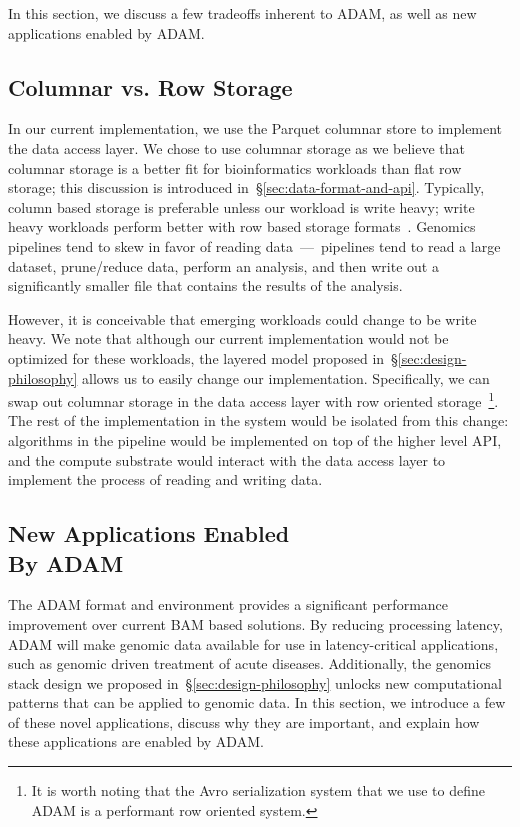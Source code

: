 \documentclass[10pt,twocolumn]{article}
\theoremstyle{plain}
\begin{document}
In this section, we discuss a few tradeoffs inherent to ADAM, as well as new applications enabled by ADAM.

\subsection{Columnar vs. Row Storage}
\label{sec:columnar-vs-row-storage}

In our current implementation, we use the Parquet columnar store to implement the data access layer. We chose to use
columnar storage as we believe that columnar storage is a better fit for bioinformatics workloads than flat row storage;
this discussion is introduced in~\S\ref{sec:data-format-and-api}. Typically, column based storage is preferable unless
our workload is write heavy; write heavy workloads perform better with row based storage formats~\cite{stonebraker05}.
Genomics pipelines tend to skew in favor of reading data~---~pipelines tend to read a large dataset, prune/reduce data,
perform an analysis, and then write out a significantly smaller file that contains the results of the analysis.

However, it is conceivable that emerging workloads could change to be write heavy. We note that although our current
implementation would not be optimized for these workloads, the layered model proposed in~\S\ref{sec:design-philosophy}
allows us to easily change our implementation. Specifically, we can swap out columnar storage in the data access layer with
row oriented storage~\footnote{It is worth noting that the Avro serialization system that we use to define ADAM is a performant
row oriented system.}. The rest of the implementation in the system would be isolated from this change: algorithms in the
pipeline would be implemented on top of the higher level API, and the compute substrate would interact with the data access
layer to implement the process of reading and writing data.

\subsection{New Applications Enabled\\By ADAM}
\label{sec:new-applications}

The ADAM format and environment provides a significant performance improvement over current BAM based solutions. By reducing
processing latency, ADAM will make genomic data available for use in latency-critical applications, such as genomic driven treatment
of acute diseases. Additionally, the genomics stack design we proposed in~\S\ref{sec:design-philosophy} unlocks new computational
patterns that can be applied to genomic data. In this section, we introduce a few of these novel applications, discuss why they are important,
and explain how these applications are enabled by ADAM.
\end{document}
